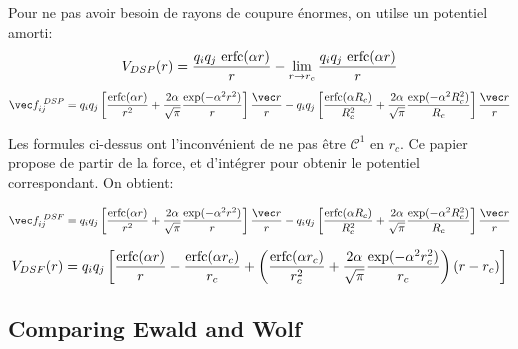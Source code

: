 \documentclass[thesis]{subfiles}
\begin{document}
Pour ne pas avoir besoin de rayons de coupure énormes, on utilse un potentiel amorti:
\[V_{DSP}(r) = \frac{q_i q_j \ \erfc(\alpha r)}{r} - \lim_{r \to r_c} \frac{q_i q_j \ \erfc(\alpha r)}{r}\]
\[\vec f_{ij}^{\ DSP} = q_i q_j \left[\frac{\erfc(\alpha r)}{r^2} + \frac{2\alpha}{\sqrt{\pi}} \frac{\exp(-\alpha^2 r^2)}{r}\right] \frac{\vec r}{r}
- q_i q_j \left[\frac{\erfc(\alpha R_c)}{R_c^2} + \frac{2\alpha}{\sqrt{\pi}} \frac{\exp(-\alpha^2 R_c^2)}{R_c}\right] \frac{\vec r}{r}\]


Les formules ci-dessus ont l'inconvénient de ne pas être $\mathcal{C}^1$ en $r_c$. Ce
papier\cite{Fennell2006} propose de partir de la force, et d'intégrer pour obtenir le potentiel
correspondant. On obtient:

\[\vec f_{ij}^{\ DSF} = q_i q_j \left[\frac{\erfc(\alpha r)}{r^2} + \frac{2\alpha}{\sqrt{\pi}} \frac{\exp(-\alpha^2 r^2)}{r}\right] \frac{\vec r}{r}
- q_i q_j \left[\frac{\erfc(\alpha R_c)}{R_c^2} + \frac{2\alpha}{\sqrt{\pi}} \frac{\exp(-\alpha^2 R_c^2)}{R_c}\right] \frac{\vec r}{r}\]

\[V_{DSF}(r) = q_i q_j \left[\frac{{\normalfont\text{erfc}}(\alpha r)}{r} - \frac{{\normalfont\text{erfc}}(\alpha r_c)}{r_c}
+ \left(\frac{{\normalfont\text{erfc}}(\alpha r_c)}{r_c^2} + \frac{2\alpha}{\sqrt{\pi}} \frac{\exp(-\alpha^2 r_c^2)}{r_c}\right) (r - r_c)\right]\]


\TODO \cite{Fukuda2013}

\subsection{Comparing Ewald and Wolf}

\OnlyInSubfile{\printbibliography}
\end{document}
